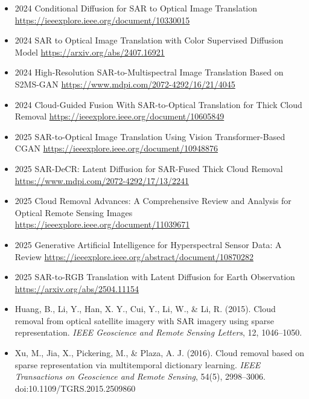 \begin{itemize}
    \item 2024  Conditional Diffusion for SAR to Optical Image Translation
    \url{https://ieeexplore.ieee.org/document/10330015}

    \item 2024  SAR to Optical Image Translation with Color Supervised Diffusion Model
    \url{https://arxiv.org/abs/2407.16921}
    
    \item 2024  High-Resolution SAR-to-Multispectral Image Translation Based on S2MS-GAN
    \url{https://www.mdpi.com/2072-4292/16/21/4045}
    
    \item 2024  Cloud-Guided Fusion With SAR-to-Optical Translation for Thick Cloud Removal
    \url{https://ieeexplore.ieee.org/document/10605849}

    \item 2025 SAR-to-Optical Image Translation Using Vision Transformer-Based CGAN
    \url{https://ieeexplore.ieee.org/document/10948876}

    \item 2025 SAR-DeCR: Latent Diffusion for SAR-Fused Thick Cloud Removal
    \url{https://www.mdpi.com/2072-4292/17/13/2241}
    
    \item 2025 Cloud Removal Advances: A Comprehensive Review and Analysis for Optical Remote Sensing Images
    \url{https://ieeexplore.ieee.org/document/11039671}
    
    \item 2025 Generative Artificial Intelligence for Hyperspectral Sensor Data: A Review
    \url{https://ieeexplore.ieee.org/abstract/document/10870282}
    
    \item 2025 SAR-to-RGB Translation with Latent Diffusion for Earth Observation
    \url{https://arxiv.org/abs/2504.11154}
    

    \item Huang, B., Li, Y., Han, X. Y., Cui, Y., Li, W., & Li, R. (2015). Cloud removal from optical satellite imagery with SAR imagery using sparse representation. \textit{IEEE Geoscience and Remote Sensing Letters}, 12, 1046–1050.

    \item Xu, M., Jia, X., Pickering, M., & Plaza, A. J. (2016). Cloud removal based on sparse representation via multitemporal dictionary learning. \textit{IEEE Transactions on Geoscience and Remote Sensing}, 54(5), 2998–3006. doi:10.1109/TGRS.2015.2509860


\end{itemize}
